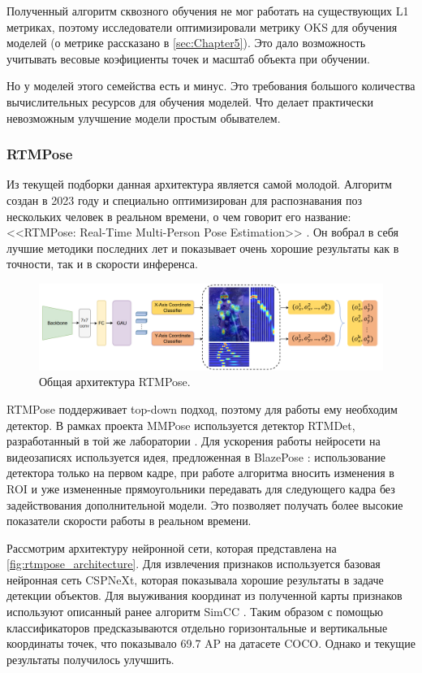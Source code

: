 Полученный алгоритм сквозного обучения не мог работать на существующих L1 метриках, поэтому исследователи оптимизировали метрику OKS для обучения моделей (о метрике рассказано в \autoref{sec:Chapter5}). Это дало возможность учитывать весовые коэфициенты точек и масштаб объекта при обучении.

Но у моделей этого семейства есть и минус. Это требования большого количества вычислительных ресурсов для обучения моделей. Что делает практически невозможным улучшение модели простым обывателем. 

\subsubsection*{RTMPose}

Из текущей подборки данная архитектура является самой молодой. Алгоритм создан в 2023 году и специально оптимизирован для распознавания поз нескольких человек в реальном времени, о чем говорит его название: <<RTMPose: Real-Time Multi-Person Pose Estimation>> \cite{rtmpose}. Он вобрал в себя лучшие методики последних лет и показывает очень хорошие результаты как в точности, так и в скорости инференса.

\begin{figure}[h]
	\centering
	\includegraphics[width=\textwidth]{./images/rtmpose}
	\caption{Общая архитектура RTMPose. \cite{rtmpose}}
	\label{fig:rtmpose_architecture}
\end{figure}

RTMPose поддерживает top-down подход, поэтому для работы ему необходим детектор. В рамках проекта MMPose используется детектор RTMDet, разработанный в той же лаборатории \cite{mmpose, rtmdet}. Для ускорения работы нейросети на видеозаписях используется идея, предложенная в BlazePose \cite{BlazePose}: использование детектора только на первом кадре, при работе алгоритма вносить изменения в ROI и уже измененные прямоугольники передавать для следующего кадра без задействования дополнительной модели. Это позволяет получать более высокие показатели скорости работы в реальном времени.

Рассмотрим архитектуру нейронной сети, которая представлена на \autoref{fig:rtmpose_architecture}. Для извлечения признаков используется базовая нейронная сеть CSPNeXt, которая показывала хорошие результаты в задаче детекции объектов. Для выуживания координат из полученной карты признаков используют описанный ранее алгоритм SimCC \cite{simcc}. Таким образом с помощью классификаторов предсказываются отдельно горизонтальные и вертикальные координаты точек, что показывало 69.7 AP на датасете COCO. Однако и текущие результаты получилось улучшить.

